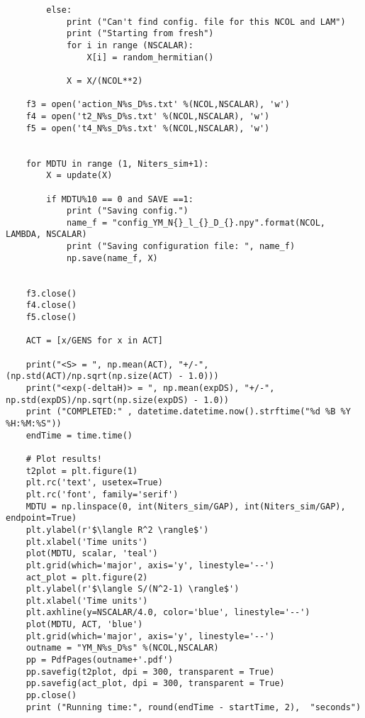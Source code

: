 \begin{lstlisting}
        else: 
            print ("Can't find config. file for this NCOL and LAM")
            print ("Starting from fresh")
            for i in range (NSCALAR):  
                X[i] = random_hermitian()

            X = X/(NCOL**2) 

    f3 = open('action_N%s_D%s.txt' %(NCOL,NSCALAR), 'w')
    f4 = open('t2_N%s_D%s.txt' %(NCOL,NSCALAR), 'w')
    f5 = open('t4_N%s_D%s.txt' %(NCOL,NSCALAR), 'w')


    for MDTU in range (1, Niters_sim+1): 
        X = update(X)

        if MDTU%10 == 0 and SAVE ==1:
            print ("Saving config.")
            name_f = "config_YM_N{}_l_{}_D_{}.npy".format(NCOL, LAMBDA, NSCALAR)
            print ("Saving configuration file: ", name_f)
            np.save(name_f, X)


    f3.close()
    f4.close()
    f5.close()

    ACT = [x/GENS for x in ACT] 
    
    print("<S> = ", np.mean(ACT), "+/-", (np.std(ACT)/np.sqrt(np.size(ACT) - 1.0)))
    print("<exp(-deltaH)> = ", np.mean(expDS), "+/-", np.std(expDS)/np.sqrt(np.size(expDS) - 1.0))
    print ("COMPLETED:" , datetime.datetime.now().strftime("%d %B %Y %H:%M:%S")) 
    endTime = time.time() 

    # Plot results!
    t2plot = plt.figure(1) 
    plt.rc('text', usetex=True)
    plt.rc('font', family='serif')
    MDTU = np.linspace(0, int(Niters_sim/GAP), int(Niters_sim/GAP), endpoint=True)
    plt.ylabel(r'$\langle R^2 \rangle$')
    plt.xlabel('Time units')
    plot(MDTU, scalar, 'teal') 
    plt.grid(which='major', axis='y', linestyle='--')
    act_plot = plt.figure(2) 
    plt.ylabel(r'$\langle S/(N^2-1) \rangle$')
    plt.xlabel('Time units')
    plt.axhline(y=NSCALAR/4.0, color='blue', linestyle='--')
    plot(MDTU, ACT, 'blue') 
    plt.grid(which='major', axis='y', linestyle='--')
    outname = "YM_N%s_D%s" %(NCOL,NSCALAR)
    pp = PdfPages(outname+'.pdf')
    pp.savefig(t2plot, dpi = 300, transparent = True)
    pp.savefig(act_plot, dpi = 300, transparent = True)
    pp.close()
    print ("Running time:", round(endTime - startTime, 2),  "seconds")
\end{lstlisting}
